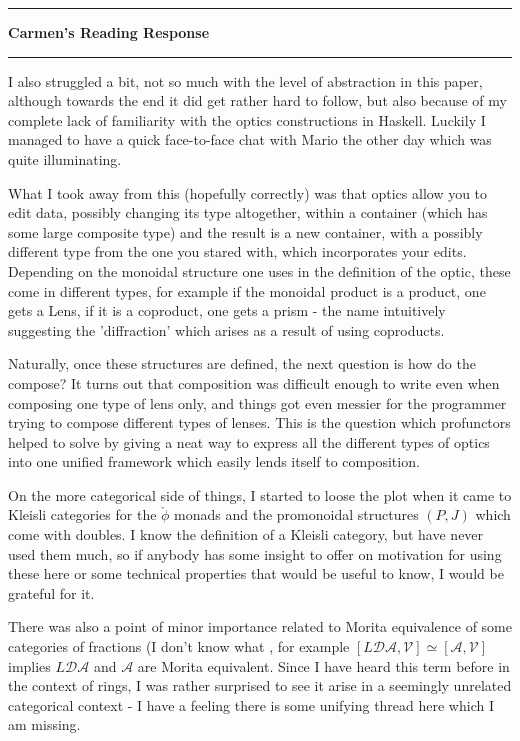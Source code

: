 \documentclass{amsart}
\newcommand{\iam}[1]{
  \vspace{0.25em}
  \hrule
  \vspace{0.25em}
  \textbf{{#1}'s Reading Response}
  \vspace{0.25em}
  \hrule
  \vspace{1em}
}
\begin{document}
\iam{Carmen}

I also struggled a bit, not so much with the level of abstraction in this paper, although towards the end it did get rather hard to follow, but also because of my complete lack of familiarity with the optics constructions in Haskell. Luckily I managed to have a quick face-to-face chat with Mario the other day which was quite illuminating. 

What I took away from this (hopefully correctly) was that optics allow you to edit data, possibly changing its type altogether, within a container (which has some large composite type) and the result is a new container, with a possibly different type from the one you stared with, which incorporates your edits. Depending on the monoidal structure one uses in the definition of the optic, these come in different types, for example if the monoidal product is a product, one gets a Lens, if it is a coproduct, one gets a prism - the name intuitively suggesting the 'diffraction' which arises as a result of using coproducts.

Naturally, once these structures are defined, the next question is how do the compose? It turns out that composition was difficult enough to write even when composing one type of lens only, and things got even messier for the programmer trying to compose different types of lenses. This is the question which profunctors helped to solve by giving a neat way to express all the different types of optics into one unified framework which easily lends itself to composition.

On the more categorical side of things, I started to loose the plot when it came to Kleisli categories for the $\check\phi$ monads and the promonoidal structures $(P,J)$ which come with doubles. I know the definition of a Kleisli category, but have never used them much, so if anybody has some insight to offer on motivation for using these here or some technical properties that would be useful to know, I would be grateful for it.

There was also a point of minor importance related to Morita equivalence of some categories of fractions (I don't know what , for example $[L\mathcal{DA},\mathcal{V}]\simeq [\mathcal{A},\mathcal{V}]$ implies $L\mathcal{DA}$ and $\mathcal{A}$ are Morita equivalent.  Since I have heard this term before in the context of rings, I was rather surprised to see it arise in a seemingly unrelated categorical context - I have a feeling there is some unifying thread here which I am missing. 
\end{document}
